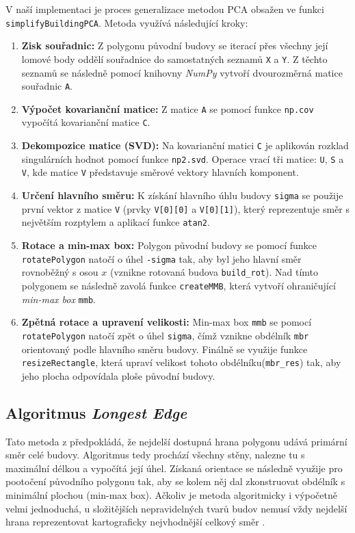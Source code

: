 \documentclass[12pt, a4paper]{article}
\begin{document}
V naší implementaci je proces generalizace metodou PCA obsažen ve funkci \texttt{simplifyBuildingPCA}. Metoda využívá následující kroky:

\begin{enumerate}
    \item \textbf{Zisk souřadnic:} Z polygonu původní budovy se iterací přes všechny její lomové body oddělí souřadnice do samostatných seznamů \texttt{X} a \texttt{Y}. Z těchto seznamů se následně pomocí knihovny \textit{NumPy} vytvoří dvourozměrná matice souřadnic \texttt{A}.
    \item \textbf{Výpočet kovarianční matice:} Z matice \texttt{A} se pomocí funkce \texttt{np.cov} vypočítá kovarianční matice \texttt{C}.
    \item \textbf{Dekompozice matice (SVD):} Na kovarianční matici \texttt{C} je aplikován rozklad singulárních hodnot pomocí funkce \texttt{np2.svd}. Operace vrací tři matice: \texttt{U}, \texttt{S} a \texttt{V}, kde matice \texttt{V} představuje směrové vektory hlavních komponent.
    \item \textbf{Určení hlavního směru:} K získání hlavního úhlu budovy \texttt{sigma} se použije první vektor z matice \texttt{V} (prvky \texttt{V[0][0]} a \texttt{V[0][1]}), který reprezentuje směr s největším rozptylem a aplikací funkce \texttt{atan2}.
    \item \textbf{Rotace a min-max box:} Polygon původní budovy se pomocí funkce \texttt{rotatePolygon} natočí o úhel \texttt{-sigma} tak, aby byl jeho hlavní směr rovnoběžný s osou $x$ (vznikne rotovaná budova \texttt{build\_rot}). Nad tímto polygonem se následně zavolá funkce \texttt{createMMB}, která vytvoří ohraničující \textit{min-max box} \texttt{mmb}.
    \item \textbf{Zpětná rotace a upravení velikosti:} Min-max box \texttt{mmb} se pomocí \texttt{rotatePolygon} natočí zpět o úhel \texttt{sigma}, čímž vznikne obdélník \texttt{mbr} orientovaný podle hlavního směru budovy. Finálně se využije funkce \texttt{resizeRectangle}, která upraví velikost tohoto obdélníku(\texttt{mbr\_res}) tak, aby jeho plocha odpovídala ploše původní budovy.
\end{enumerate}

\subsection{Algoritmus \textit{Longest Edge}}
Tato metoda z předpokládá, že nejdelší dostupná hrana polygonu udává primární směr celé budovy. Algoritmus tedy prochází všechny stěny, nalezne tu s maximální délkou a vypočítá její úhel. Získaná orientace se následně využije pro pootočení původního polygonu tak, aby se kolem něj dal zkonstruovat obdélník s minimální plochou (min-max box). Ačkoliv je metoda algoritmicky i výpočetně velmi jednoduchá, u složitějších nepravidelných tvarů budov nemusí vždy nejdelší hrana reprezentovat kartograficky nejvhodnější celkový směr \parencite{bayer}.
\end{document}
